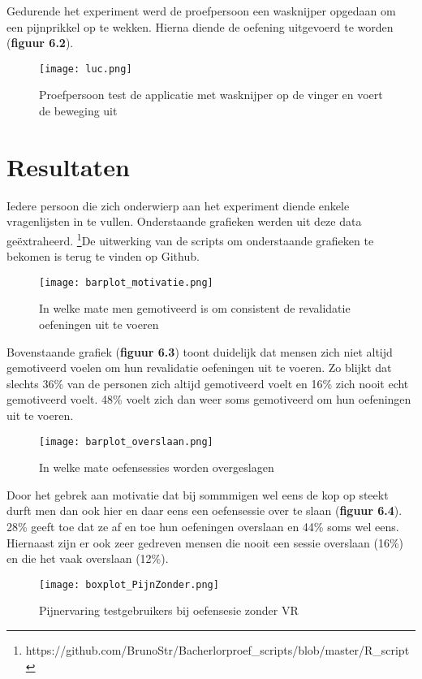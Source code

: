 Gedurende het experiment werd de proefpersoon een wasknijper opgedaan om een pijnprikkel op te wekken. Hierna diende de oefening uitgevoerd te worden (\textbf{figuur 6.2}). 

\begin{figure}[h]
    \centering
    \texttt{[image: luc.png]}
    \caption{Proefpersoon test de applicatie met wasknijper op de vinger en voert de beweging uit}
    \label{figuur 6.2}
\end{figure}

\newpage

\section{Resultaten}
Iedere persoon die zich onderwierp aan het experiment diende enkele vragenlijsten in te vullen. Onderstaande grafieken werden uit deze data geëxtraheerd.
\footnote{https://github.com/BrunoStr/Bacherlorproef\_scripts/blob/master/R\_script}De uitwerking van de scripts om onderstaande grafieken te bekomen is terug te vinden op Github.

\begin{figure}[h]
    \centering
    \texttt{[image: barplot\_motivatie.png]}
    \caption{In welke mate men gemotiveerd is om consistent de revalidatie oefeningen uit te voeren}
    \label{figuur 6.3}
\end{figure}

Bovenstaande grafiek (\textbf{figuur 6.3}) toont duidelijk dat mensen zich niet altijd gemotiveerd voelen om hun revalidatie oefeningen uit te voeren. Zo blijkt dat slechts 36\% van de personen zich altijd gemotiveerd voelt en 16\% zich nooit echt gemotiveerd voelt. 48\% voelt zich dan weer soms gemotiveerd om hun oefeningen uit te voeren.

\begin{figure}[h]
    \centering
    \texttt{[image: barplot\_overslaan.png]}
    \caption{In welke mate oefensessies worden overgeslagen}
    \label{figuur 6.4}
\end{figure}

Door het gebrek aan motivatie dat bij sommmigen wel eens de kop op steekt durft men dan ook hier en daar eens een oefensessie over te slaan (\textbf{figuur 6.4}). 28\% geeft toe dat ze af en toe hun oefeningen overslaan en 44\% soms wel eens. Hiernaast zijn er ook zeer gedreven mensen die nooit een sessie overslaan (16\%) en die het vaak overslaan (12\%).

\begin{figure}[h]
    \centering
    \texttt{[image: boxplot\_PijnZonder.png]}
    \caption{Pijnervaring testgebruikers bij oefensesie zonder VR}
    \label{figuur 6.5}
\end{figure}

